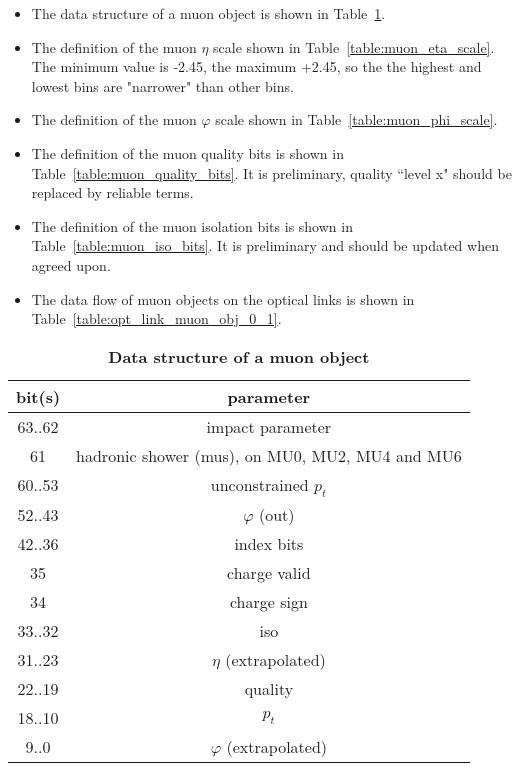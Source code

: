 \documentclass{cmspaper}
\begin{document}
\begin{itemize}
\item The data structure of a muon object is shown in Table~\ref{table:muon_object}.
\item The definition of the muon $\eta$ scale shown in Table~\ref{table:muon_eta_scale}. The minimum value is -2.45, the maximum +2.45, so the the highest and lowest
bins are "narrower" than other bins.
\item The definition of the muon $\varphi$ scale shown in Table~\ref{table:muon_phi_scale}.
\item The definition of the muon quality bits is shown in Table~\ref{table:muon_quality_bits}. It is preliminary, quality ``level x" should be replaced by reliable terms.
\item The definition of the muon isolation bits is shown in Table~\ref{table:muon_iso_bits}. It is preliminary and should be updated when agreed upon.
\item The data flow of muon objects on the optical links is shown in Table~\ref{table:opt_link_muon_obj_0_1}.
\end{itemize}

\begin{table}[ht]
\caption{\bf Data structure of a muon object}
\vspace{5mm}
\centering
\begin{tabular}{|c|c|}\hline
bit(s) & parameter \\\hline\hline
63..62 & impact parameter \\
61 & hadronic shower (mus), on MU0, MU2, MU4 and MU6 \\
60..53 & unconstrained $p_t$ \\
52..43 & $\varphi$ (out) \\
42..36 & index bits \\
35 & charge valid \\
34 & charge sign \\
33..32 & iso \\
31..23 & $\eta$ (extrapolated) \\
22..19 & quality \\
18..10 & $p_t$ \\
9..0 & $\varphi$ (extrapolated) \\\hline
\end{tabular}
\label{table:muon_object}
\end{table}
\end{document}
